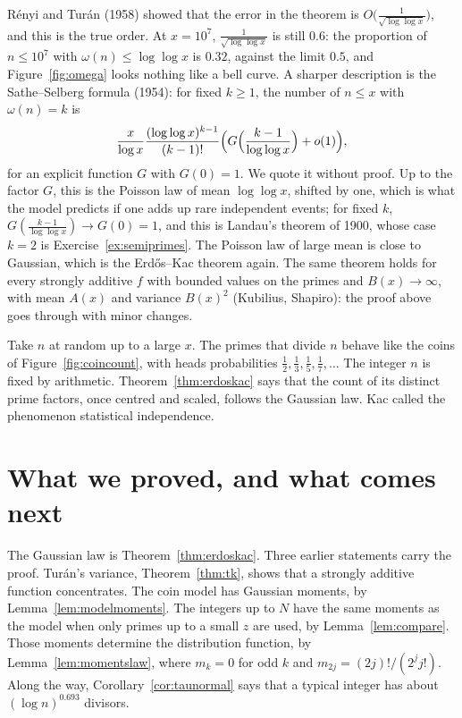 \begin{remark}
Rényi and Turán (1958) showed that the error in the theorem is $O\bigl(\frac1{\sqrt{\log\log x}}\bigr)$, and this is the true order. At $x=10^7$, $\frac1{\sqrt{\log\log x}}$ is still $0.6$: the proportion of $n\le10^7$ with $\omega(n)\le\log\log x$ is $0.32$, against the limit $0.5$, and Figure~\ref{fig:omega} looks nothing like a
bell curve. A sharper description is the Sathe--Selberg formula (1954): for fixed $k\ge1$, the number of $n\le x$ with $\omega(n)=k$ is
\[
\frac x{\log x}\frac{(\log\log x)^{k-1}}{(k-1)!}\Bigl(G\Bigl(\frac{k-1}{\log\log x}\Bigr)+o(1)\Bigr),
\]
for an explicit function $G$ with $G(0)=1$. We quote it without proof. Up to the factor $G$, this is the Poisson law of mean $\log\log x$, shifted by one, which is what the model predicts if one adds up rare independent
events; for fixed $k$, $G(\frac{k-1}{\log\log x})\to G(0)=1$, and this is Landau's theorem of 1900, whose case $k=2$ is Exercise~\ref{ex:semiprimes}. The Poisson law of large mean is close to Gaussian, which is the Erd\H{o}s--Kac theorem again. The same theorem holds for every
strongly additive $f$ with bounded values on the primes and $B(x)\to\infty$, with mean $A(x)$ and variance $B(x)^2$ (Kubilius, Shapiro): the proof above goes through with minor changes.
\end{remark}

\begin{beauty}
Take $n$ at random up to a large $x$. The primes that divide $n$ behave like the coins of Figure~\ref{fig:coincount}, with heads probabilities $\frac12,\frac13,\frac15,\frac17,\dots$ The integer $n$ is fixed by arithmetic. Theorem~\ref{thm:erdoskac} says that the count of its distinct prime factors, once centred and scaled, follows the Gaussian law. Kac called the phenomenon statistical independence.
\end{beauty}

\section{What we proved, and what comes next}

The Gaussian law is Theorem~\ref{thm:erdoskac}. Three earlier statements carry the proof. Turán's variance, Theorem~\ref{thm:tk}, shows that a strongly additive function concentrates. The coin model has Gaussian moments, by Lemma~\ref{lem:modelmoments}. The integers up to $N$ have the same moments as the model when only primes up to a small $z$ are used, by Lemma~\ref{lem:compare}. Those moments determine the distribution function, by Lemma~\ref{lem:momentslaw}, where $m_k=0$ for odd $k$ and $m_{2j}=(2j)!/(2^j j!)$. Along the way, Corollary~\ref{cor:taunormal} says that a typical integer has about $(\log n)^{0.693}$ divisors.

